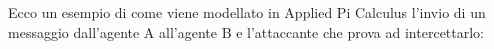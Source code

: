 

\noindent Ecco un esempio di come viene modellato in Applied Pi Calculus l'invio di un messaggio dall'agente A all'agente B e l'attaccante che prova ad intercettarlo:





